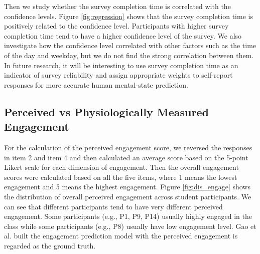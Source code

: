 \documentclass[sigconf]{acmart}
\begin{document}
Then we study whether the survey completion time is correlated with the confidence levels. Figure \ref{fig:regression} shows that the survey completion time is positively related to the confidence level. Participants with higher survey completion time tend to have a higher confidence level of the survey. We also investigate how the confidence level correlated with other factors such as the time of the day and weekday, but we do not find the strong correlation between them. In future research, it will be interesting to use survey completion time as an indicator of survey reliability and assign appropriate weights to self-report responses for more accurate human mental-state prediction.
\begin{comment}
\begin{figure}
    \centering
    \texttt{[image: image/result.pdf]}
    \caption{Prediction performance across different classifiers}
    \label{fig:my_label}
\end{figure}
\end{comment}


\subsection{Perceived vs Physiologically Measured Engagement}

For the calculation of the perceived engagement score, we reversed the responses in item 2 and item 4 and then calculated an average score based on the 5-point Likert scale for each dimension of engagement. Then the overall engagement scores were calculated based on all the five items, where 1 means the lowest engagement and 5 means the highest engagement. Figure \ref{fig:dis_engage} shows the distribution of overall perceived engagement across student participants. We can see that different participants tend to have very different perceived engagement. Some participants (e.g., P1, P9, P14) usually highly engaged in the class while some participants (e.g., P8) usually have low engagement level. Gao et al. \cite{gao2020n} built the engagement prediction model with the perceived engagement is regarded as the ground truth.
\end{document}
